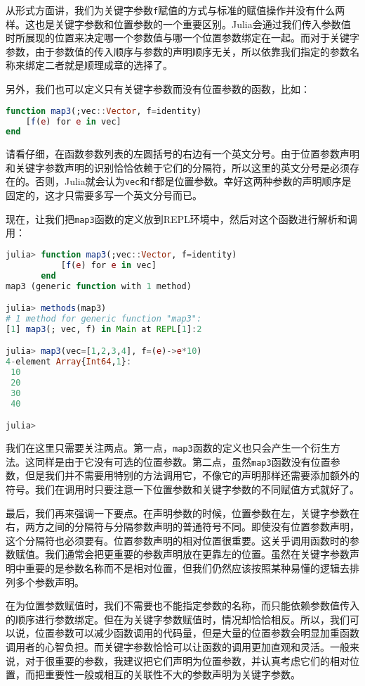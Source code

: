 从形式方面讲，我们为关键字参数\verb`f`赋值的方式与标准的赋值操作并没有什么两样。这也是关键字参数和位置参数的一个重要区别。Julia会通过我们传入参数值时所展现的位置来决定哪一个参数值与哪一个位置参数绑定在一起。而对于关键字参数，由于参数值的传入顺序与参数的声明顺序无关，所以依靠我们指定的参数名称来绑定二者就是顺理成章的选择了。

另外，我们也可以定义只有关键字参数而没有位置参数的函数，比如：

\begin{lstlisting}[language=julia]
function map3(;vec::Vector, f=identity)
    [f(e) for e in vec]
end
\end{lstlisting}

请看仔细，在函数参数列表的左圆括号的右边有一个英文分号。由于位置参数声明和关键字参数声明的识别恰恰依赖于它们的分隔符，所以这里的英文分号是必须存在的。否则，Julia就会认为\verb`vec`和\verb`f`都是位置参数。幸好这两种参数的声明顺序是固定的，这才只需要多写一个英文分号而已。

现在，让我们把\verb`map3`函数的定义放到REPL环境中，然后对这个函数进行解析和调用：

\begin{lstlisting}[language=julia]
julia> function map3(;vec::Vector, f=identity)
           [f(e) for e in vec]
       end
map3 (generic function with 1 method)

julia> methods(map3)
# 1 method for generic function "map3":
[1] map3(; vec, f) in Main at REPL[1]:2

julia> map3(vec=[1,2,3,4], f=(e)->e*10)
4-element Array{Int64,1}:
 10
 20
 30
 40

julia>
\end{lstlisting}

我们在这里只需要关注两点。第一点，\verb`map3`函数的定义也只会产生一个衍生方法。这同样是由于它没有可选的位置参数。第二点，虽然\verb`map3`函数没有位置参数，但是我们并不需要用特别的方法调用它，不像它的声明那样还需要添加额外的符号。我们在调用时只要注意一下位置参数和关键字参数的不同赋值方式就好了。

最后，我们再来强调一下要点。在声明参数的时候，位置参数在左，关键字参数在右，两方之间的分隔符与分隔参数声明的普通符号不同。即使没有位置参数声明，这个分隔符也必须要有。位置参数声明的相对位置很重要。这关乎调用函数时的参数赋值。我们通常会把更重要的参数声明放在更靠左的位置。虽然在关键字参数声明中重要的是参数名称而不是相对位置，但我们仍然应该按照某种易懂的逻辑去排列多个参数声明。

在为位置参数赋值时，我们不需要也不能指定参数的名称，而只能依赖参数值传入的顺序进行参数绑定。但在为关键字参数赋值时，情况却恰恰相反。所以，我们可以说，位置参数可以减少函数调用的代码量，但是大量的位置参数会明显加重函数调用者的心智负担。而关键字参数恰恰可以让函数的调用更加直观和灵活。一般来说，对于很重要的参数，我建议把它们声明为位置参数，并认真考虑它们的相对位置，而把重要性一般或相互的关联性不大的参数声明为关键字参数。

